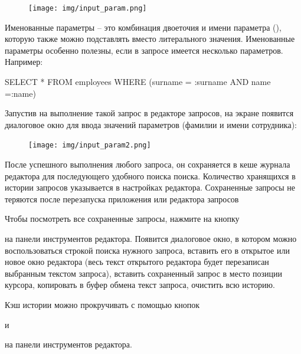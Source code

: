 \begin{figure}[H]
	\centering
	\texttt{[image: img/input\_param.png]}
\end{figure}

Именованные параметры -- это комбинация двоеточия и имени параметра (), которую также можно подставлять вместо литерального значения. Именованные параметры особенно полезны, если в запросе имеется несколько параметров. Например:

\begin{redexample}\ttfamily
	SELECT * FROM employees WHERE (surname = :surname AND name =:name)  
\end{redexample}

Запустив на выполнение такой запрос в редакторе запросов, на экране появится диалоговое окно для ввода значений параметров (фамилии и имени сотрудника):

\begin{figure}[H]
	\centering
	\texttt{[image: img/input\_param2.png]}
\end{figure}

\label{sec:query_history}

После успешного выполнения любого запроса, он сохраняется в кеше журнала редактора для последующего удобного поиска поиска. Количество хранящихся в истории запросов указывается в настройках редактора. Сохраненные запросы не теряются после перезапуска приложения или редактора запросов

Чтобы посмотреть все сохраненные запросы, нажмите на кнопку 
на панели инструментов редактора. Появится диалоговое окно, в котором можно воспользоваться строкой поиска нужного запроса, вставить его в открытое или новое окно редактора (весь текст открытого редактора будет перезаписан выбранным текстом запроса), вставить сохраненный запрос в место позиции курсора, копировать в буфер обмена текст запроса, очистить всю историю. 

Кэш истории можно прокручивать с помощью кнопок 
и 
 на панели инструментов редактора. 

